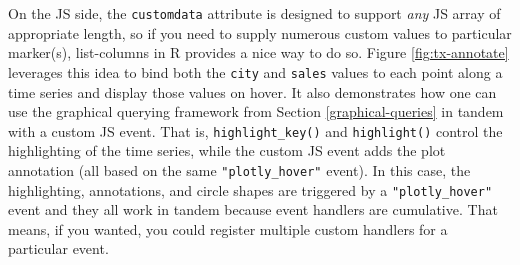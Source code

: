 \documentclass[
  12pt,
]{krantz}
\newenvironment{Shaded}{\begin{snugshade}}{\end{snugshade}}
\newcommand{\DataTypeTok}[1]{\textcolor[rgb]{0.13,0.29,0.53}{#1}}
\newcommand{\KeywordTok}[1]{\textcolor[rgb]{0.13,0.29,0.53}{\textbf{#1}}}
\newcommand{\NormalTok}[1]{#1}
\newcommand{\OperatorTok}[1]{\textcolor[rgb]{0.81,0.36,0.00}{\textbf{#1}}}
\newcommand{\StringTok}[1]{\textcolor[rgb]{0.31,0.60,0.02}{#1}}
\begin{document}
On the JS side, the \texttt{customdata} attribute is designed to support \emph{any} JS array of appropriate length, so if you need to supply numerous custom values to particular marker(s), list-columns in R provides a nice way to do so. Figure \ref{fig:tx-annotate} leverages this idea to bind both the \texttt{city} and \texttt{sales} values to each point along a time series and display those values on hover. It also demonstrates how one can use the graphical querying framework from Section \ref{graphical-queries} in tandem with a custom JS event. That is, \texttt{highlight\_key()} and \texttt{highlight()} control the highlighting of the time series, while the custom JS event adds the plot annotation (all based on the same \texttt{"plotly\_hover"} event). In this case, the highlighting, annotations, and circle shapes are triggered by a \texttt{"plotly\_hover"} event and they all work in tandem because event handlers are cumulative. That means, if you wanted, you could register multiple custom handlers for a particular event.


\begin{Shaded}
\end{Shaded}
\end{document}
